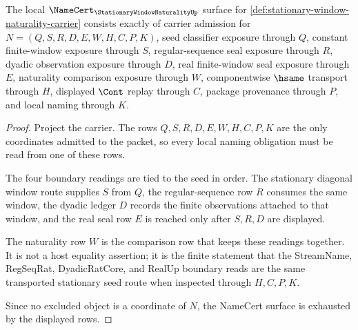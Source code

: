 \begin{theorem}
\label{thm:stationary-window-naturality-namecert-obligations}
The local $\NameCert_{\StationaryWindowNaturalityUp}$ surface for \autoref{def:stationary-window-naturality-carrier} consists exactly of carrier admission for $N=(Q,S,R,D,E,W,H,C,P,K)$, seed classifier exposure through $Q$, constant finite-window exposure through $S$, regular-sequence seal exposure through $R$, dyadic observation exposure through $D$, real finite-window seal exposure through $E$, naturality comparison exposure through $W$, componentwise $\hsame$ transport through $H$, displayed $\Cont$ replay through $C$, package provenance through $P$, and local naming through $K$.
\end{theorem}
\begin{proof}
Project the carrier. The rows $Q,S,R,D,E,W,H,C,P,K$ are the only coordinates admitted to the packet, so every local naming obligation must be read from one of these rows.

The four boundary readings are tied to the seed in order. The stationary diagonal window route supplies $S$ from $Q$, the regular-sequence row $R$ consumes the same window, the dyadic ledger $D$ records the finite observations attached to that window, and the real seal row $E$ is reached only after $S,R,D$ are displayed.

The naturality row $W$ is the comparison row that keeps these readings together. It is not a host equality assertion; it is the finite statement that the StreamName, RegSeqRat, DyadicRatCore, and RealUp boundary reads are the same transported stationary seed route when inspected through $H,C,P,K$.

Since no excluded object is a coordinate of $N$, the NameCert surface is exhausted by the displayed rows.
\end{proof}

